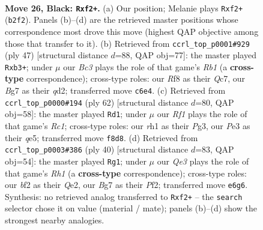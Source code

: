 \documentclass[11pt]{article}
\begin{document}
\clearpage

\begin{figure}[p]\centering
\begin{subfigure}{0.46\textwidth}\centering
\resizebox{\linewidth}{!}{%
\newchessgame
\chessboard[
  setfen={5rk1/p4pb1/2bpq3/7p/P6P/4p3/1r3B1K/2RQ3R b - - 3 26},
  showmover=false,
  pgfstyle=straightmove, color=movearrow, markmove={b2-f2}
]}
\caption{}
\end{subfigure}\hfill
\begin{subfigure}{0.46\textwidth}\centering
\resizebox{\linewidth}{!}{%
\newchessgame
\chessboard[
  setfen={1r6/2q1kpp1/p2pb2p/5P2/8/1P6/3Q2PP/1K2RBR1 b - - 0 24},
  showmover=false,
  pgfstyle=straightmove, color=movearrow, markmove={b8-b3}
]}
\caption{}
\end{subfigure}
\\[4pt]
\begin{subfigure}{0.46\textwidth}\centering
\resizebox{\linewidth}{!}{%
\newchessgame
\chessboard[
  setfen={2r1r1k1/p6p/6p1/2B1qn2/1P1p4/6P1/PQ3R1P/2R3K1 w - - 0 32},
  showmover=false,
  pgfstyle=straightmove, color=movearrow, markmove={c1-d1}
]}
\caption{}
\end{subfigure}\hfill
\begin{subfigure}{0.46\textwidth}\centering
\resizebox{\linewidth}{!}{%
\newchessgame
\chessboard[
  setfen={2k2b1r/p4ppp/q3r3/2p5/1P6/4B3/P3QP1P/2R1K2R w K - 2 21},
  showmover=false,
  pgfstyle=straightmove, color=movearrow, markmove={h1-g1}
]}
\caption{}
\end{subfigure}
\caption{\textbf{Move 26, Black: \texttt{Rxf2+}.} (a) Our position; Melanie plays \texttt{Rxf2+} (\texttt{b2f2}). Panels (b)--(d) are the retrieved master positions whose correspondence most drove this move (highest QAP objective among those that transfer to it). (b) Retrieved from \texttt{ccrl\_top\_p0001\#929} (ply 47) [structural distance $d$=88, QAP obj=77]: the master played \texttt{Rxb3+}; under $\mu$ our \emph{Bc3} plays the role of that game's \emph{Rb1} (a \textbf{cross-type} correspondence); cross-type roles: our \emph{R}f8 as their \emph{Q}c7, our \emph{B}g7 as their \emph{q}d2; transferred move \texttt{c6e4}. (c) Retrieved from \texttt{ccrl\_top\_p0000\#194} (ply 62) [structural distance $d$=80, QAP obj=58]: the master played \texttt{Rd1}; under $\mu$ our \emph{Rf1} plays the role of that game's \emph{Rc1}; cross-type roles: our \emph{r}h1 as their \emph{P}g3, our \emph{P}e3 as their \emph{q}e5; transferred move \texttt{f8d8}. (d) Retrieved from \texttt{ccrl\_top\_p0003\#386} (ply 40) [structural distance $d$=83, QAP obj=54]: the master played \texttt{Rg1}; under $\mu$ our \emph{Qe3} plays the role of that game's \emph{Rh1} (a \textbf{cross-type} correspondence); cross-type roles: our \emph{b}f2 as their \emph{Q}e2, our \emph{B}g7 as their \emph{P}f2; transferred move \texttt{e6g6}. Synthesis: no retrieved analog transferred to \texttt{Rxf2+} -- the \texttt{search} selector chose it on value (material / mate); panels (b)--(d) show the strongest nearby analogies.}
\label{fig:thought-m51}
\end{figure}
\end{document}
